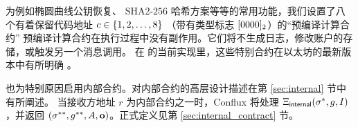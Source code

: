 为例如椭圆曲线公钥恢复、 SHA2-$256$ 哈希方案等等的常用功能，我们设置了八个有着保留代码地址 $c\in{\left \{{1,2,\dots,8} \right \}}$ （带有类型标志 $[0000]_2$）的``预编译计算合约''
预编译计算合约在执行过程中没有副作用。它们将不生成日志，修改账户的存储，或触发另一个消息调用。
%
在 \name 的当前实现里，这些特别合约在以太坊的最新版本中有所明确 \cite{ETH_yellow}。

\name 也为特别原因启用内部合约。对内部合约的高层设计描述在第 \ref{sec:internal} 节中有所阐述。
当接收方地址 $r$ 为内部合约之一时，Conflux 将处理 $\mathrm{\Xi}_{\sf internal}(\mathbf{\sigma}^*,g,I)$，并返回 $\left(\mathbf{\sigma}^{**}, g^{**},  A, \mathbf{o} \right)$。正式定义见第 \ref{sec:internal_contract} 节。

